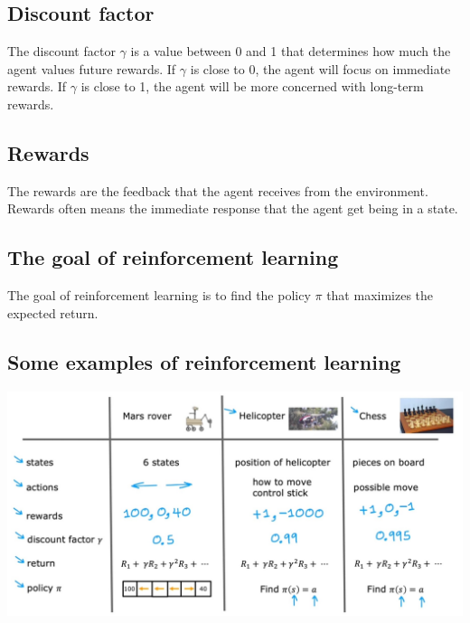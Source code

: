     \subsection*{Discount factor}
    The discount factor $\gamma$ is a value between 0 and 1 that determines how much the agent values future rewards.
    If $\gamma$ is close to 0, the agent will focus on immediate rewards. If $\gamma$ is close to 1, the agent will
    be more concerned with long-term rewards.
    \subsection*{Rewards}
    The rewards are the feedback that the agent receives from the environment. Rewards often means the immediate
    response that the agent get being in a state.

\subsection*{The goal of reinforcement learning}
The goal of reinforcement learning is to find the policy $\pi$ that maximizes the expected return.
\subsection*{Some examples of reinforcement learning}
\noindent
\includegraphics*[width=\textwidth]{images/17.3}

